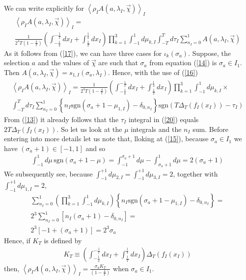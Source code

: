 \documentclass{appolb}
\newcommand{\sgn}{\text{sgn}}
\begin{document}
We can write explicitly for $\left \langle \rho_{I} A(a,\lambda_{I},\vec{\chi})\right\rangle_{I}$
\begin{eqnarray}\label{19}
\left \langle \rho_{I} A(a,\lambda_{I},\vec{\chi})\right\rangle_{I} = 
\nonumber\\
\frac{1}{2^4T\left(1-\frac{4}{T}\right)}\left( \int_{-\frac{1}{4}}^{-\frac{1}{T}} d x_{I} + \int_{\frac{1}{T}}^{\frac{1}{4}} d x_{I}\right)\prod_{k=1}^3 \int_{-1}^1 d\mu_{k,I} \int_{-T}^{T} d\tau_{I} \sum_{n_{I}=0}^1 A(a,\lambda_{I},\vec{\chi})
\end{eqnarray}
As it follows from (\ref{17}), we can have three cases for $\iota_k(\sigma_a)$. 
Suppose, the selection $a$ and the values of $\vec{\chi}$ are such that $\sigma_a$ from equation (\ref{14}) is $\sigma_a\in I_1$. Then $A(a,\lambda_{I},\vec{\chi})=s_{1,I}(\sigma_a,\lambda_{I})$. Hence, with the use of (\ref{16})
\begin{eqnarray}\label{20}
\left \langle \rho_{I} A(a,\lambda_{I},\vec{\chi})\right\rangle_{I} = \frac{1}{2^4T\left(1-\frac{4}{T}\right)}\left( \int_{-\frac{1}{4}}^{-\frac{1}{T}} d x_{I} + \int_{\frac{1}{T}}^{\frac{1}{4}} d x_{I}\right)\prod_{k=1}^3 \int_{-1}^1 d\mu_{k,I}\times\nonumber\\
\int_{-T}^{T} d\tau_{I} \sum_{n_{I}=0}^1 \left\{n_{I}\sgn\left(\sigma_a+1-\mu_{1,I} \right)-\delta_{0,n_{I}} \right\}\sgn \left( T\Delta_T(f_{I}(x_{I}))-\tau_{I} \right)
\end{eqnarray}
From (\ref{13}) it already follows that the $\tau_{I}$ integral in (\ref{20}) equals $2T\Delta_T(f_{I}(x_{I}))$. So let us look at the $\mu$ integrals and the $n_{I}$ sum. 
Before entering into more details let us note that, lloking at (\ref{15}), because $\sigma_a \in I_1$ we have $\left(\sigma_a + 1\right) \in [-1,1]$ and so
\begin{eqnarray}\label{20a}
\int_{-1}^1 d\mu \,\sgn\left(\sigma_a + 1 - \mu\right) =\int_{-1}^{\sigma_a+1 } d\mu- \int_{\sigma_a + 1}^1 d\mu = 2\left(\sigma_a+1\right) 
\end{eqnarray}
We subsequently see, because $\int_{-1}^{+1 } d\mu_{2,I}=\int_{-1}^{+1 } d\mu_{3,I}=2$, together with $\int_{-1}^{+1 } d\mu_{1,I}=2$,
\begin{eqnarray}\label{21}
 \sum_{n_{I}=0}^1\left(\prod_{k=1}^3 \int_{-1}^1 d\mu_{k,I}\right) \left\{n_{I}\sgn\left(\sigma_a+1-\mu_{1,I} \right)-\delta_{0,n_{I}} \right\} =\nonumber\\
 2^3  \sum_{n_{I}=0}^1 \left[  n_{I}(\sigma_a+1)-\delta_{0,n_{I}}\right]=\nonumber\\
2^3[-1+(\sigma_a+1)]=2^3 \sigma_a
\end{eqnarray}
Hence, if $K_T$ is defined by 
\begin{eqnarray}\label{22}
K_T\equiv \left( \int_{-\frac{1}{4}}^{-\frac{1}{T}} d x_{I} + \int_{\frac{1}{T}}^{\frac{1}{4}} d x_{I}\right)\Delta_T(f_{I}(x_{I}))
\end{eqnarray}
then, $\left \langle \rho_{I} A(a,\lambda_{I},\vec{\chi})\right\rangle_{I}=\frac{\sigma_a K_T}{\left(1-\frac{4}{T}\right)}$ when $\sigma_a \in I_1$. 
\end{document}
